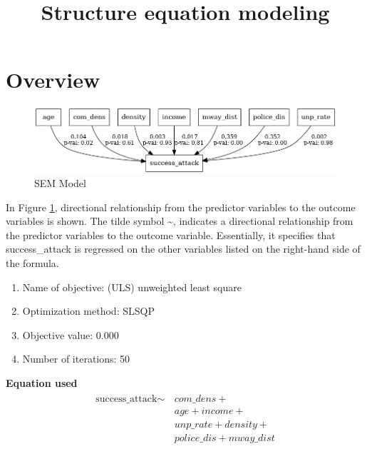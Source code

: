\documentclass[10pt, conference, compsocconf]{IEEEtran}
\title{Structure equation modeling}
\begin{document}
	
	
	\maketitle
	
\section{Overview}	
	\begin{figure}[h!]
		\centering
		\includegraphics[width=\linewidth]{success.png}
		\caption{SEM Model}
		\label{fig:Model}
	\end{figure}
	
	In Figure \ref{fig:Model}, directional relationship from the predictor variables to the outcome variables is shown. 
	The tilde symbol \textasciitilde,  indicates a directional relationship from the predictor variables to the outcome variable. Essentially, it specifies that success\_attack is regressed on the other variables listed on the right-hand side of the formula.
	
\begin{enumerate}
	\item Name of objective: (ULS) unweighted least square 
	\item  Optimization method: SLSQP
	\item  Objective value: 0.000
	\item  Number of iterations: 50
\end{enumerate}	
\textbf{Equation used}
\begin{subequations}
	\begin{align}
		\begin{split}
			\text{success\_attack} \sim &\, com\_dens + \\
			&\, age + income + \\
			&\, unp\_rate + density + \\
			&\, police\_dis + mway\_dist
		\end{split}
	\end{align}
\end{subequations}
\end{document}
